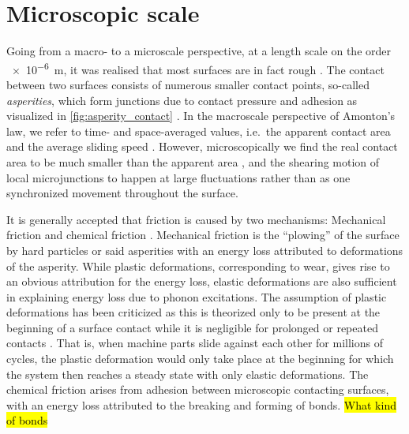 




\section{Microscopic scale}\label{sec:microscale}
Going from a macro- to a microscale perspective, at a length scale on the order
\SI{e-6}{m}, it was realised that most surfaces are in fact rough
\cite{mo_friction_2009}. The contact between two surfaces consists of numerous
smaller contact points, so-called \textit{asperities}, which form junctions due to contact pressure and adhesion as visualized in \cref{fig:asperity_contact} \cite{kim_nano-scale_2009}. In the macroscale perspective of Amonton's law, we refer to time- and space-averaged values, i.e.\ the apparent contact area and the average
sliding speed \cite{gao_frictional_2004}. However, microscopically we find the
real contact area to be much smaller than the apparent area \cite{kim_nano-scale_2009}, and the shearing motion of local microjunctions to happen at large fluctuations rather than as one synchronized movement throughout the surface. 

It is generally accepted that friction is caused by two mechanisms: Mechanical
friction and chemical friction \cite{kim_nano-scale_2009}. Mechanical
friction is the ``plowing'' of the surface by hard particles or said asperities
with an energy loss attributed to deformations of the asperity. While plastic
deformations, corresponding to wear, gives rise to an obvious attribution for
the energy loss, elastic deformations are also sufficient in explaining energy
loss due to phonon excitations. The assumption of plastic deformations
has been criticized as this is theorized only to be present at the beginning of
a surface contact while it is negligible for prolonged or repeated contacts
\cite{CARBONE20082555}. That is, when machine parts slide against each other for
millions of cycles, the plastic deformation would only take place at the beginning for which the system then reaches a steady state with only elastic deformations.
The chemical friction arises from adhesion between microscopic contacting
surfaces, with an energy loss attributed to the breaking and forming of bonds. \hl{What kind of bonds} 



